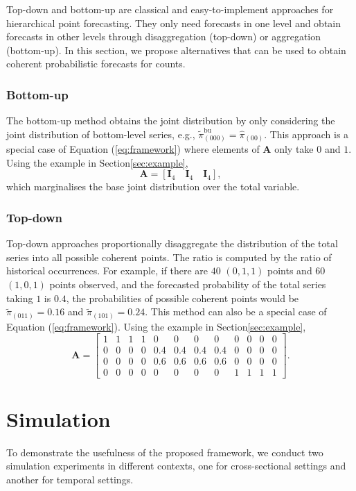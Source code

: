 \documentclass[a4paper,review,12pt,authoryear]{elsarticle}
\begin{document}
     Top-down and bottom-up are classical and easy-to-implement approaches for hierarchical point forecasting. 
     They only need forecasts in one level and obtain forecasts in other levels through disaggregation (top-down) or aggregation (bottom-up).
     In this section, we propose alternatives that can be used to obtain coherent probabilistic forecasts for counts.
     \subsubsection*{Bottom-up}
     \label{sec:bottomup}
     The bottom-up method obtains the joint distribution by only considering the joint distribution of bottom-level series, e.g., $\tilde\pi^{\text{bu}}_{(000)} = \hat\pi_{(00)}$. 
     This approach is a special case of Equation (\ref{eq:framework}) where elements of $\mathbf{A}$ only take $0$ and $1$. 
     Using the example in Section\ref{sec:example},
     \[
      \mathbf{A} = [\mathbf{I}_4\quad \mathbf{I}_4 \quad \mathbf{I}_4 ],
    \]
     which marginalises the base joint distribution over the total variable.
  
     \subsubsection*{Top-down}
  
     Top-down approaches proportionally disaggregate the distribution of the total series into all possible coherent points. 
     The ratio is computed by the ratio of historical occurrences.
     For example, if there are $40$ $(0, 1, 1)$ points and $60$ $(1, 0, 1) $ points observed, and the forecasted probability of the total series taking $1$ is $0.4$, the probabilities of possible coherent points would be $\tilde \pi_{(011)} = 0.16$ and $\tilde \pi_{(101)} = 0.24$.
     This method can also be a special case of Equation (\ref{eq:framework}).
     Using the example in Section\ref{sec:example},
     \[
      \mathbf{A} = \left[\begin{matrix}
        1 & 1 & 1 & 1 & 0 & 0 & 0 & 0 & 0 & 0 & 0 & 0 \\
        0 & 0 & 0 & 0 & 0.4 & 0.4 & 0.4 & 0.4 & 0 & 0 & 0 & 0 \\      
        0 & 0 & 0 & 0 & 0.6 & 0.6 & 0.6 & 0.6 & 0 & 0 & 0 & 0 \\
        0 & 0 & 0 & 0 & 0 & 0 & 0 & 0 & 1 & 1 & 1 & 1  
      \end{matrix}\right].
     \]

     \section{Simulation}
     \label{sec:simulation}
     To demonstrate the usefulness of the proposed framework, we conduct two simulation experiments in different contexts, one for cross-sectional settings and another for temporal settings. 
     
\end{document}
